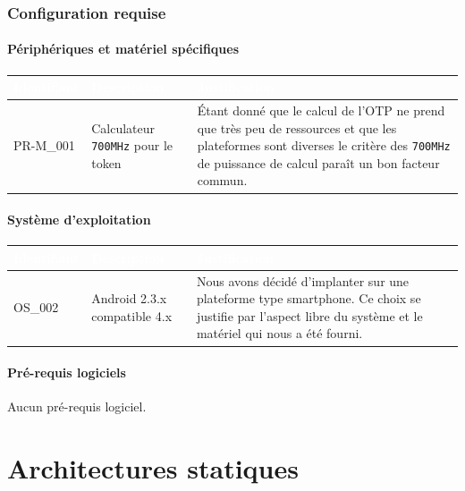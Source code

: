 \documentclass{"../../res/univ-projet"}
\begin{document}
\section{Configuration requise}

\subsection{Périphériques et matériel spécifiques}
\begin{tabular}{|p{}|p{}|p{}|}
    \hline
    \rowcolor{gray}
    \textcolor{white}{\bfseries Identifiant} & 
    \textcolor{white}{\bfseries Description} &
    \textcolor{white}{\bfseries Justification} \\
    \hline
    PR-M\_001 &
    Calculateur \verb?700MHz? pour le token &
    Étant donné que le calcul de l'OTP ne prend que très peu de ressources
    et que les plateformes sont diverses le critère des \verb?700MHz? de puissance
    de calcul paraît un bon facteur commun.\\
    \hline
\end{tabular}

\subsection{Système d'exploitation}
\begin{tabular}{|p{}|p{}|p{}|}
    \hline
    \rowcolor{gray}
    \textcolor{white}{\bfseries Identifiant} & 
    \textcolor{white}{\bfseries Description} &
    \textcolor{white}{\bfseries Justification} \\
    \hline
    OS\_002&
    Android 2.3.x compatible 4.x&
    Nous avons décidé d'implanter sur une plateforme type
    smartphone. Ce choix se justifie par
    l'aspect libre du système et le matériel qui nous a été fourni.\\
    \hline
\end{tabular}

\subsection{Pré-requis logiciels}

Aucun pré-requis logiciel.


\part*{Architectures statiques}
\end{document}
